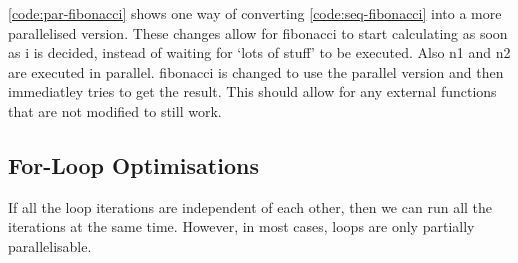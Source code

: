 \documentclass[conference]{IEEEtran}
\begin{document}
\autoref{code:par-fibonacci} shows one way of converting \autoref{code:seq-fibonacci} into a more parallelised version. These changes allow for fibonacci to start calculating as soon as i is decided, instead of waiting for `lots of stuff' to be executed. Also n1 and n2 are executed in parallel. fibonacci is changed to use the parallel version and then immediatley tries to get the result. This should allow for any external functions that are not modified to still work.

\subsection{For-Loop Optimisations}
If all the loop iterations are independent of each other, then we can run all the iterations at the same time. However, in most cases, loops are only partially parallelisable.

\begin{comment}
\subsubsection{List manipulation}

\begin{algorithm}
\caption{Sequential For Loop}
\label{code:seq-for}
\begin{verbatim}
let mut list = vec![1,2,3,4,5];
for i in 0..list.len() {
    list[i] *= 2;
}
\end{verbatim}
\end{algorithm}

could be converted into
\todo{Make code below compile}

\begin{algorithm}
\caption{Parallel For Loop}
\label{code:par-for}
\begin{verbatim}
let mut list = vec![1,2,3,4,5];
// Create a communication channel
let (tx, rx) = mpsc::channel();
// Start all threads
for i in 0..list.len() {
    let element = list[i];
    let tx = tx.clone();
    thread::spawn(move || {
        let result = element * 2;
        tx.send((i, result));
    });
}

// Receive all the results and update list
for _ in 0..list.len() {
    let (i, result) = rx.receive();
    list[i] = result;
}
\end{verbatim}
\end{algorithm}

In this simple case, the inner for loop has one operations and so the threaded version would be slower due to overhead. If the operation inside the loop was more complex, and the list was longer, then this conversion would make sense.

\end{comment}
\end{document}
